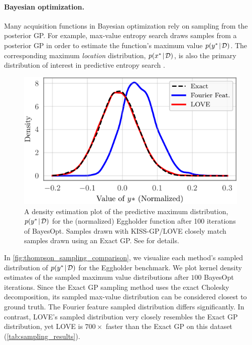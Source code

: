 \paragraph{Bayesian optimization.}
Many acquisition functions in Bayesian optimization rely on sampling from the posterior GP.
For example, max-value entropy search \cite{wang2017max} draws samples from a posterior GP in order to estimate the function's maximum value $p(y^{*} \! \mid \! \mathcal D)$.
The corresponding maximum \emph{location} distribution, $p(x^{*} \! \mid \! \mathcal D)$, is also the primary distribution of interest in predictive entropy search \cite{hernandez2014predictive}.
%
\begin{figure}[t!]
  \centering
  \includegraphics[width=\columnwidth]{figures/thompson_sampling_comparison.pdf}
  \vspace{-4ex}
  \caption{
    A density estimation plot of the predictive maximum distribution, $p(y^* \! \mid \! \mathcal D)$ for the (normalized) Eggholder function after 100 iterations of BayesOpt.
    Samples drawn with KISS-GP/LOVE{} closely match samples drawn using an Exact GP. See \citet{wang2017max} for details.
    \label{fig:thompson_sampling_comparison}
  }
    \vspace{-2ex}
\end{figure}
%
In \autoref{fig:thompson_sampling_comparison}, we visualize each method's sampled distribution of $p(y^{*} \! \mid \! \mathcal D)$ for the Eggholder benchmark.
We plot kernel density estimates of the sampled maximum value distributions after $100$ BayesOpt iterations.
Since the Exact GP sampling method uses the exact Cholesky decomposition, its sampled max-value distribution can be considered closest to ground truth.
The Fourier feature sampled distribution differs significantly.
In contrast, LOVE{}'s sampled distribution very closely resembles the Exact GP distribution, yet
LOVE{} is $700 \times$ faster than the Exact GP on this dataset (\autoref{tab:sampling_results}).
